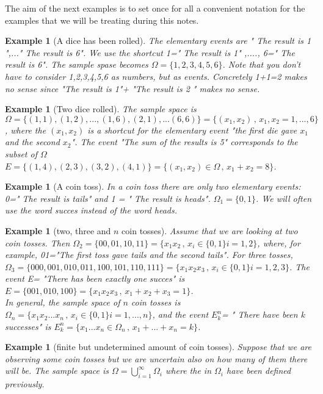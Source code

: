 \documentclass[12pt]{article}
\newtheorem{example}[theorem]{Example}
\newcommand{\<}{{\langle \!\! \langle}}
\renewcommand{\>}{{\rangle \!\! \rangle}}
\begin{document}
The aim of the next examples is to set once for all a convenient notation for the examples that we will be treating during this notes.

\begin{example}[A dice has been rolled]
The elementary events are " The result is 1 ",..." The result is 6". We use the shortcut 1=" The result is 1" ,...., 6=" The result is 6". The sample spase becomes $\Omega=\{1,2,3,4,5,6\}$. Note that you don't have to consider  1,2,3,4,5,6 as numbers, but as events. Concretely 1+1=2 makes no sense since "The result is 1"+ "The result is 2 " makes no sense.
\end{example}

\begin{example}[Two dice rolled]
	The sample space is $\Omega=\{(1,1),(1,2),...,(1,6),(2,1),...(6,6) \} = \{(x_1,x_2)\,,\, x_1,x_2=1,...,6\}$, where the $(x_1,x_2)$ is a shortcut for the elementary event "the first die gave $x_1$ and the second $x_2$". The event "The sum of the results is 5" corresponds to the subset of $\Omega$ $E=\{(1,4),(2,3),(3,2),(4,1)\}=\{(x_1,x_2)\in \Omega \,,\,x_1+x_2=8\}$.   
\end{example}

\begin{example}[A coin toss]
In a coin toss there are only two elementary events: 0=" The result is tails" and 1 = " The result is heads". $\Omega_1=\{0,1\}$. We will often use the word succes instead of the word heads.   
\end{example}

\begin{example}[two, three and $n$ coin tosses]
Assume that we are looking at two coin tosses. Then $\Omega_2=\{00,01,10,11\}= \{x_1x_2\,,\, x_i\in\{0,1\} i=1,2\}$, where, for example,  01="The first toss gave tails and the second tails". For three tosses, $\Omega_3=\{000,001,010,011,100,101,110,111\}=\{x_1x_2x_3\,,\,x_i\in\{0,1\} i=1,2,3\}$. The event E= "There has been exactly one succes" is $E=\{001,010,100\}=\{x_1x_2x_3\,,\,x_1+x_2+x_3=1\}$. \\
In general, the sample space of $n$ coin tosses is $\Omega_n=\{x_1x_2...x_n\,,\,x_i\in\{0,1\} i=1,...,n\}$, and the event $E^n_k$= " There have been $k$ successes" is $ E^n_k=\{x_1...x_n\in \Omega_n\,,\,x_1+...+x_n=k\}$.     
\end{example}

\begin{example}[finite but undetermined amount of coin tosses]
Suppose that we are observing some coin tosses but we are uncertain also on how many of them there will be. The sample space is $\Omega=\bigcup_{i=1}^\infty \Omega_i$ where the  in $\Omega_i$ have been defined previously. 

\end{example}
\end{document}
